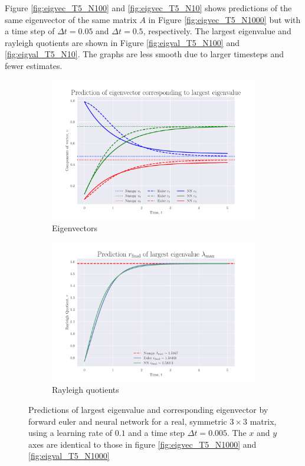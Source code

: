 \documentclass[12pt]{extarticle}
\begin{document}
Figure \ref{fig:eigvec_T5_N100} and \ref{fig:eigvec_T5_N10} shows predictions of the same eigenvector of the same matrix $A$ in Figure \ref{fig:eigvec_T5_N1000} but with a time step of $\Delta t = 0.05$ and $\Delta t = 0.5$, respectively. The largest eigenvalue and rayleigh quotients are shown in Figure \ref{fig:eigval_T5_N100} and \ref{fig:eigval_T5_N10}.
The graphs are less smooth due to larger timesteps and fewer estimates. 

\begin{figure}[h]
	
	\centering
	\begin{subfigure}{0.49\textwidth}
		\centering
		\includegraphics[width=\textwidth]{../output/plots/eigvec_T5_N1000_eta01.pdf}
		\caption{Eigenvectors}
		\label{fig:eigvec_T5_N1000_eta01}
	\end{subfigure}
	\hfill
	\begin{subfigure}{0.49\textwidth}
		\centering
		\includegraphics[width=\textwidth]{../output/plots/eigval_T5_N1000_eta01.pdf}
		\caption{Rayleigh quotients}
		\label{fig:eigval_T5_N1000_eta01}
	\end{subfigure}
	\caption{Predictions of largest eigenvalue and corresponding eigenvector by forward euler and neural network for a real, symmetric $3\times 3$ matrix, using a learning rate of $0.1$ and a time step $\Delta t = 0.005$. The $x$ and $y$ axes are identical to those in figure \ref{fig:eigvec_T5_N1000} and \ref{fig:eigval_T5_N1000}}
	\label{fig:eig_T5_N1000_eta01}
\end{figure}
\end{document}
